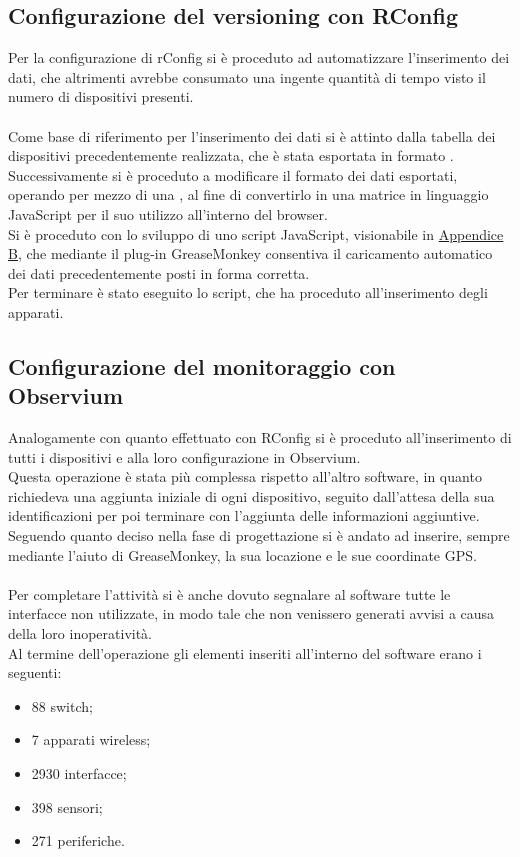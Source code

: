 \documentclass[Realizzazione.tex]{subfiles}
\begin{document}
\subsection{Configurazione del versioning con RConfig}
Per la configurazione di rConfig si è proceduto ad automatizzare l'inserimento dei dati, che altrimenti avrebbe consumato una ingente quantità di tempo visto il numero di dispositivi presenti. \\\\
Come base di riferimento per l'inserimento dei dati si è attinto dalla tabella dei dispositivi precedentemente realizzata, che è stata esportata in formato .\\
Successivamente si è proceduto a modificare il formato dei dati esportati, operando per mezzo di una , al fine di convertirlo in una matrice in linguaggio JavaScript per il suo utilizzo all'interno del browser. \\
Si è proceduto con lo sviluppo di uno script JavaScript, visionabile in \hyperref[sec:Appendice B]{Appendice B}, che mediante il plug-in GreaseMonkey consentiva il caricamento automatico dei dati precedentemente posti in forma corretta. \\
Per terminare è stato eseguito lo script, che ha proceduto all'inserimento degli apparati. \\

\subsection{Configurazione del monitoraggio con Observium}
Analogamente con quanto effettuato con RConfig si è proceduto all'inserimento di tutti i dispositivi e alla loro configurazione in Observium. \\
Questa operazione è stata più complessa rispetto all'altro software, in quanto richiedeva una aggiunta iniziale di ogni dispositivo, seguito dall'attesa della sua identificazioni per poi terminare con l'aggiunta delle informazioni aggiuntive. Seguendo quanto deciso nella fase di progettazione si è andato ad inserire, sempre mediante l'aiuto di GreaseMonkey, la sua locazione e le sue coordinate GPS. \\\\
Per completare l'attività si è anche dovuto segnalare al software tutte le interfacce non utilizzate, in modo tale che non venissero generati avvisi a causa della loro inoperatività.\\

Al termine dell'operazione gli elementi inseriti all'interno del software erano i seguenti:
\begin{itemize}
	\item 88 switch;
	\item 7 apparati wireless;
	\item 2930 interfacce;
	\item 398 sensori;
	\item 271 periferiche.
\end{itemize}
\end{document}
